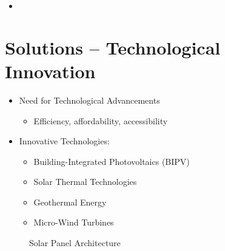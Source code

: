 \documentclass[
  letterpaper,
  DIV=11,
  numbers=noendperiod]{scrartcl}
\providecommand{\tightlist}{%
  \setlength{\itemsep}{0pt}\setlength{\parskip}{0pt}}\usepackage{longtable,booktabs,array}
\begin{document}
\begin{itemize}
\tightlist
\item
\end{itemize}

\section{Solutions -- Technological
Innovation}\label{solutions-technological-innovation}

\begin{itemize}
\tightlist
\item
  Need for Technological Advancements

  \begin{itemize}
  \tightlist
  \item
    Efficiency, affordability, accessibility
  \end{itemize}
\item
  Innovative Technologies:

  \begin{itemize}
  \tightlist
  \item
    Building-Integrated Photovoltaics (BIPV)
  \item
    Solar Thermal Technologies
  \item
    Geothermal Energy
  \item
    Micro-Wind Turbines
  \end{itemize}
\end{itemize}

\begin{figure}


\caption{\label{fig-solutions}Solar Panel Architecture}

\end{figure}%
\end{document}
